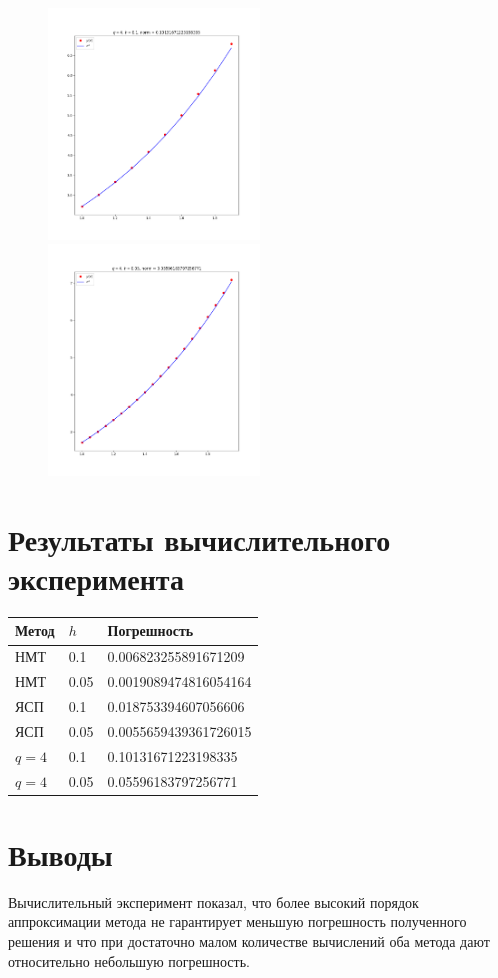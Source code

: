 \documentclass{article}
\begin{document}
\begin{figure}[H]
\includegraphics[width=0.5\textwidth]{Figure_5.png}
\includegraphics[width=0.5\textwidth]{Figure_6.png}
\end{figure}

\section*{Результаты вычислительного эксперимента}
\begin{tabular}[H]{|l|l|l|}
  \hline
  Метод & $h$ & Погрешность \\
  \hline
  НМТ &   0.1         &    0.006823255891671209 \\
  НМТ &   0.05        & 0.0019089474816054164    \\
  ЯСП &   0.1         &  0.018753394607056606   \\
  ЯСП &   0.05        &   0.0055659439361726015  \\
  $   q=4 $    & 0.1  & 0.10131671223198335 \\
  $   q=4 $    & 0.05 &  0.05596183797256771\\
  \hline
\end{tabular} 
\section*{Выводы}
Вычислительный эксперимент показал, что более высокий порядок аппроксимации
метода не гарантирует меньшую погрешность полученного решения и что при
достаточно малом количестве вычислений оба метода дают относительно небольшую
погрешность.
\end{document}
